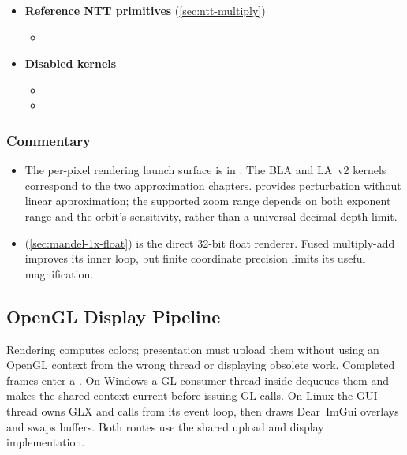 \begin{itemize}
\item \textbf{Reference NTT primitives} (\cref{sec:ntt-multiply})
  \begin{itemize}
    \item {}
  \end{itemize}

\item \textbf{Disabled kernels}
  \begin{itemize}
    \item {}
    \item {}
  \end{itemize}

\end{itemize}

\subsubsection{Commentary}

\begin{itemize}

\item The per-pixel rendering launch surface is in .
The BLA and LA~v2 kernels correspond to the two approximation chapters.
 provides perturbation without linear
approximation; the supported zoom range depends on both exponent range and
the orbit's sensitivity, rather than a universal decimal depth limit.

\item {} (\cref{sec:mandel-1x-float}) is the direct
32-bit float renderer. Fused multiply-add improves its inner loop, but finite
coordinate precision limits its useful magnification.

\end{itemize}
\subsection{OpenGL Display Pipeline}
\label{subsec:opengl-display}

Rendering computes colors; presentation must upload them without using an
OpenGL context from the wrong thread or displaying obsolete work. Completed
frames enter a . On Windows a GL consumer thread
inside  dequeues them and makes the shared context
current before issuing GL calls. On Linux the GUI thread owns GLX and calls
 from its event loop, then draws Dear~ImGui overlays and
swaps buffers. Both routes use the shared upload and display implementation.

